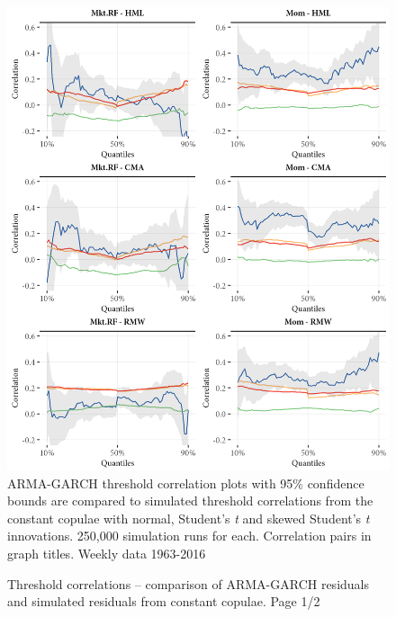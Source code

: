 \begin{figure}[H]
  \caption{Threshold correlations -- comparison of ARMA-GARCH residuals and simulated residuals from constant copulae. Page 1/2}
  \label{fig:threshold_simulated1}
  \centering
  \begin{minipage}{\textwidth}
  \includegraphics[scale=1]{graphics/threshold_simulated1.png}  
  \vspace{3mm}
  \footnotesize
  ARMA-GARCH threshold correlation plots with 95\% confidence bounds are compared to simulated threshold correlations from the constant copulae with normal, Student's \textit{t} and skewed Student's \textit{t} innovations. 250,000 simulation runs for each. Correlation pairs in graph titles. Weekly data 1963-2016
  \end{minipage}
\end{figure}
